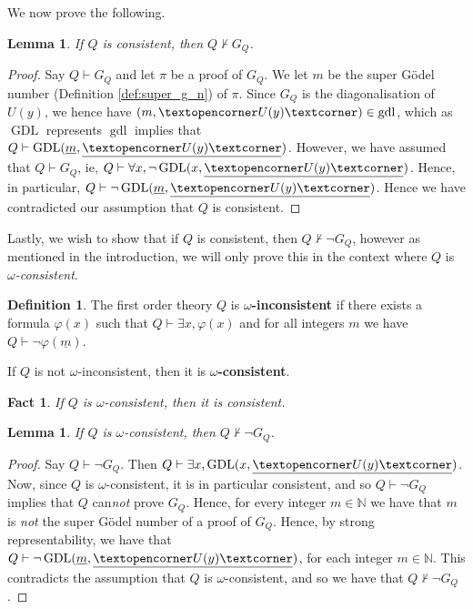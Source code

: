 \documentclass[12pt]{article}
\theoremstyle{plain}
\newtheorem{lemma}[thm]{Lemma}
\newtheorem{fact}[thm]{Fact}
\theoremstyle{definition}
\newtheorem{defn}[thm]{Definition} %
\newcommand{\bb}[1]{\mathbb{#1}}
\newcommand{\adj}[1]{\text{\textopencorner}{#1}\text{\textcorner}}
\begin{document}
	We now prove the following.
	\begin{lemma}\label{lem:consistent}
		If $Q$ is consistent, then $Q \not\vdash G_Q$.
	\end{lemma}
	\begin{proof}
		Say $Q \vdash G_Q$ and let $\pi$ be a proof of $G_Q$. We let $m$ be the super G\"{o}del number (Definition \ref{def:super_g_n}) of $\pi$. Since $G_Q$ is the diagonalisation of $U(y)$, we hence have $(m,\adj{U(y)}) \in \operatorname{gdl}$, which as $\operatorname{GDL}$ represents $\operatorname{gdl}$ implies that $Q \vdash \operatorname{GDL}(\underline{m},\underline{\adj{U(y)}})$. However, we have assumed that $Q \vdash G_Q$, ie, $Q \vdash \forall x, \neg \operatorname{GDL}(x, \underline{\adj{U(y)}})$. Hence, in particular, $Q \vdash \neg \operatorname{GDL}(\underline{m},\underline{\adj{U(y)}})$. Hence we have contradicted our assumption that $Q$ is consistent.
	\end{proof}
	Lastly, we wish to show that if $Q$ is consistent, then $Q \not\vdash \neg G_Q$, however as mentioned in the introduction, we will only prove this in the context where $Q$ is \emph{$\omega$-consistent}.
	\begin{defn}\label{def:omega_inconsistent}
		The first order theory $Q$ is \textbf{$\omega$-inconsistent} if there exists a formula $\varphi(x)$ such that $Q \vdash \exists x, \varphi(x)$ and for all integers $m$ we have $Q \vdash \neg \varphi(\underline{m})$.
		
		If $Q$ is not $\omega$-inconsistent, then it is \textbf{$\omega$-consistent}.
	\end{defn}
	\begin{fact}
		If $Q$ is $\omega$-consistent, then it is consistent.
	\end{fact}
	\begin{lemma}\label{lem:omega_consistent}
		If $Q$ is $\omega$-consistent, then $Q \not\vdash \neg G_Q$.
	\end{lemma}
	\begin{proof}
		Say $Q \vdash \neg G_Q$. Then $Q \vdash \exists x, \operatorname{GDL}(x,\underline{\adj{U(y)}})$. Now, since $Q$ is $\omega$-consistent, it is in particular consistent, and so $Q \vdash \neg G_Q$ implies that $Q$ can\emph{not} prove $G_Q$. Hence, for every integer $m \in \bb{N}$ we have that $m$ is \emph{not} the super G\"{o}del number of a proof of $G_Q$. Hence, by strong representability, we have that $Q \vdash \neg\operatorname{GDL}(\underline{m},\underline{\adj{U(y)}})$, for each integer $m \in \bb{N}$. This contradicts the assumption that $Q$ is $\omega$-consistent, and so we have that $Q \not\vdash \neg G_Q$.
	\end{proof}
\end{document}
